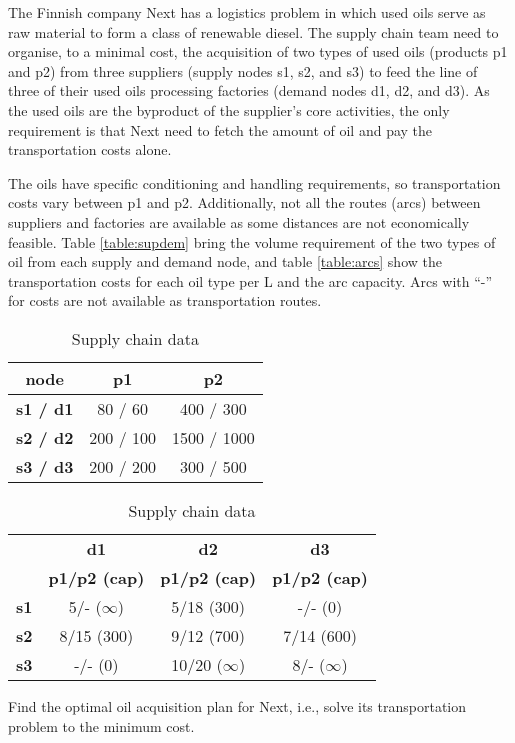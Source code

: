 The Finnish company Next has a logistics problem in which used oils serve as raw material to form a class of renewable diesel. 
The supply chain team need to organise, to a minimal cost, the acquisition of two types of used oils (products p1 and p2) from three suppliers 
(supply nodes s1, s2, and s3) to feed the line of three of their used oils processing factories (demand nodes d1, d2, and d3). 
As the used oils are the byproduct of the supplier's core activities, the only requirement is that Next need to fetch the amount of oil and pay 
the transportation costs alone.

The oils have specific conditioning and handling requirements, so transportation costs vary between p1 and p2. Additionally, not all the routes 
(arcs) between suppliers and factories are available as some distances are not economically feasible. 
Table \ref{table:supdem} bring the volume requirement of the two types of oil from each supply and demand node, 
and table \ref{table:arcs} show the transportation costs for each oil type per L and the arc capacity. Arcs with ``-'' for costs 
are not available as transportation routes.

\begin{table}[h!]
	\begin{subtable}[h]{0.4\textwidth}
		\begin{center}
		\begin{tabular}{c|cc}
			\textbf{node} & \textbf{p1} & \textbf{p2} \\
			\hline
			\textbf{s1 / d1} & 80 / 60 & 400 / 300 \\
			\textbf{s2 / d2} & 200 / 100 & 1500 / 1000 \\
			\textbf{s3 / d3} & 200 / 200 & 300 / 500 \\
		\end{tabular}
		\end{center}
		\caption{Supply availability and demand per oil type [in L]}
		\label{table:supdem}
	\end{subtable}
	\hfill
	\begin{subtable}[h]{0.55\textwidth}
		\begin{center}
			\begin{tabular}{c|ccc}
				 & \textbf{d1} & \textbf{d2} & \textbf{d3}\\
				 & \textbf{p1/p2 (cap)} & \textbf{p1/p2 (cap)} & \textbf{p1/p2 (cap)}\\
				\hline
				\textbf{s1} & 5/- ($\infty$) & 5/18 (300) & -/- (0)\\
				\textbf{s2} & 8/15 (300) & 9/12 (700) & 7/14 (600)\\
				\textbf{s3} & -/- (0) & 10/20 ($\infty$) & 8/- ($\infty$)\\
			\end{tabular}
		\end{center}
		\caption{Arcs costs per oil type [in \euro \ per L] and arc capacities [in L]}
		\label{table:arcs}
	\end{subtable}
	\caption{Supply chain data}
	\label{table:sc}
\end{table}

Find the optimal oil acquisition plan for Next, i.e., solve its transportation problem to the minimum cost.
